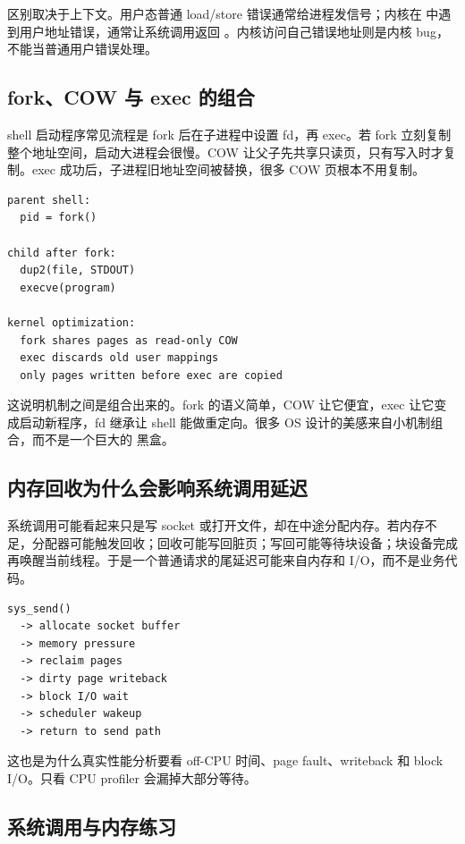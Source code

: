 区别取决于上下文。用户态普通 load/store 错误通常给进程发信号；内核在  中遇到用户地址错误，通常让系统调用返回 。内核访问自己错误地址则是内核 bug，不能当普通用户错误处理。

\subsection{fork、COW 与 exec 的组合}

shell 启动程序常见流程是 fork 后在子进程中设置 fd，再 exec。若 fork 立刻复制整个地址空间，启动大进程会很慢。COW 让父子先共享只读页，只有写入时才复制。exec 成功后，子进程旧地址空间被替换，很多 COW 页根本不用复制。

\begin{lstlisting}
parent shell:
  pid = fork()

child after fork:
  dup2(file, STDOUT)
  execve(program)

kernel optimization:
  fork shares pages as read-only COW
  exec discards old user mappings
  only pages written before exec are copied
\end{lstlisting}

这说明机制之间是组合出来的。fork 的语义简单，COW 让它便宜，exec 让它变成启动新程序，fd 继承让 shell 能做重定向。很多 OS 设计的美感来自小机制组合，而不是一个巨大的  黑盒。

\subsection{内存回收为什么会影响系统调用延迟}

系统调用可能看起来只是写 socket 或打开文件，却在中途分配内存。若内存不足，分配器可能触发回收；回收可能写回脏页；写回可能等待块设备；块设备完成再唤醒当前线程。于是一个普通请求的尾延迟可能来自内存和 I/O，而不是业务代码。

\begin{lstlisting}
sys_send()
  -> allocate socket buffer
  -> memory pressure
  -> reclaim pages
  -> dirty page writeback
  -> block I/O wait
  -> scheduler wakeup
  -> return to send path
\end{lstlisting}

这也是为什么真实性能分析要看 off-CPU 时间、page fault、writeback 和 block I/O。只看 CPU profiler 会漏掉大部分等待。

\subsection{系统调用与内存练习}

